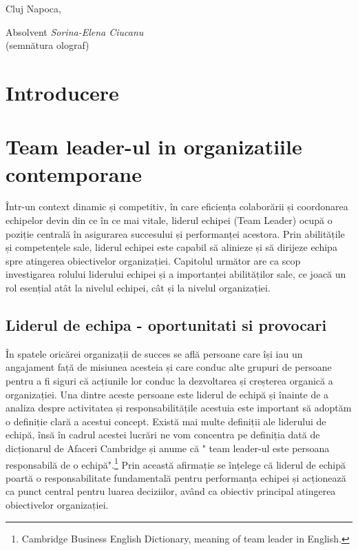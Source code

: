 \documentclass[a4paper, 12pt]{article}
\begin{document}
\vspace{3 cm}
\begin{flushleft}
	\large Cluj Napoca,
\end{flushleft}


\begin{flushright}
	\hfill \large Absolvent \textit{Sorina-Elena Ciucanu} \\
	\hfill \large {(semnătura olograf)}
\end{flushright}
\newpage
\thispagestyle{empty}
\tableofcontents
\thispagestyle{empty}
\newpage
\thispagestyle{empty}
\listoffigures
\newpage
\thispagestyle{empty}
\listoftables


\newpage



	\section*{Introducere}

\newpage
	\setcounter{section}{0}
	\section{Team leader-ul in organizatiile contemporane}
\quad \quad\space Într-un context dinamic și competitiv, în care eficiența colaborării și coordonarea echipelor devin din ce în ce mai vitale, liderul echipei (Team Leader) ocupă o poziție centrală în asigurarea succesului și performanței acestora. Prin abilitățile și competențele sale, liderul echipei este capabil să alinieze și să dirijeze echipa spre atingerea obiectivelor organizației. Capitolul următor are ca scop investigarea rolului liderului echipei și a importanței abilităților sale, ce joacă un rol esențial atât la nivelul echipei, cât și la nivelul organizației.
		\subsection{ Liderul de echipa - oportunitati si provocari}

\quad\quad\space În spatele oricărei organizații de succes se află persoane care își iau un angajament față de misiunea acesteia și care conduc alte grupuri de persoane pentru a fi siguri că acțiunile lor conduc la dezvoltarea și creșterea organică a organizației. Una dintre aceste persoane este liderul de echipă și înainte de a analiza despre activitatea și responsabilitățile acestuia este important să adoptăm o definiție clară a acestui concept. Există mai multe definiții ale liderului de echipă, însă în cadrul acestei lucrări ne vom concentra pe definiția dată de dicționarul de Afaceri Cambridge și anume că " team leader-ul  este persoana responsabilă de o echipă".\footnote{Cambridge Business English Dictionary, meaning of team leader in English.} Prin această afirmație se înțelege că liderul de echipă poartă o responsabilitate fundamentală pentru performanța echipei și acționează ca punct central pentru luarea deciziilor, având ca obiectiv principal atingerea obiectivelor organizației.
\end{document}
